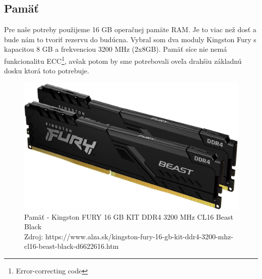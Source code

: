 \documentclass[12pt,oneside,slovak,a4paper]{article}
\begin{document}
\subsection{Pamäť}
Pre naše potreby použijeme 16 GB operačnej pamäte RAM. Je to viac než dosť a bude nám to tvoriť rezervu do budúcna. Vybral som dva moduly Kingston Fury s kapacitou 8 GB a frekvenciou 3200 MHz (2x8GB). Pamäť síce nie nemá funkcionalitu ECC\footnote{Error-correcting code}, avšak potom by sme potrebovali oveľa drahšiu základnú dosku ktorá toto potrebuje.

\begin{figure}[H]
	\centering
	\captionsetup{justification=centering,margin=2cm}
	\includegraphics[scale=0.1]{./images/ram.png} %
	\centering
	\caption{Pamäť - Kingston FURY 16 GB KIT DDR4 3200 MHz CL16 Beast Black \\ Zdroj: https://www.alza.sk/kingston-fury-16-gb-kit-ddr4-3200-mhz-cl16-beast-black-d6622616.htm}
\end{figure}
\end{document}
